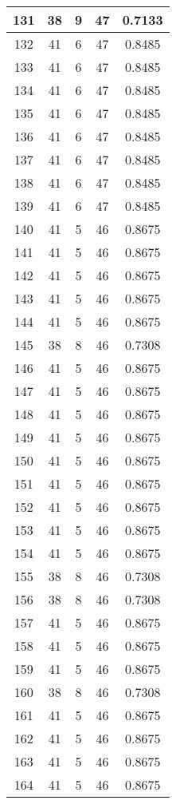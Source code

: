 \documentclass[letterpaper, 12pt]{article}
\begin{document}
\begin{longtable}{|c|c|c|c|c|}
\hline
131 & 38 & 9 & 47 & 0.7133 \\
\hline
132 & 41 & 6 & 47 & 0.8485 \\
\hline
133 & 41 & 6 & 47 & 0.8485 \\
\hline
134 & 41 & 6 & 47 & 0.8485 \\
\hline
135 & 41 & 6 & 47 & 0.8485 \\
\hline
136 & 41 & 6 & 47 & 0.8485 \\
\hline
137 & 41 & 6 & 47 & 0.8485 \\
\hline
138 & 41 & 6 & 47 & 0.8485 \\
\hline
139 & 41 & 6 & 47 & 0.8485 \\
\hline
140 & 41 & 5 & 46 & 0.8675 \\
\hline
141 & 41 & 5 & 46 & 0.8675 \\
\hline
142 & 41 & 5 & 46 & 0.8675 \\
\hline
143 & 41 & 5 & 46 & 0.8675 \\
\hline
144 & 41 & 5 & 46 & 0.8675 \\
\hline
145 & 38 & 8 & 46 & 0.7308 \\
\hline
146 & 41 & 5 & 46 & 0.8675 \\
\hline
147 & 41 & 5 & 46 & 0.8675 \\
\hline
148 & 41 & 5 & 46 & 0.8675 \\
\hline
149 & 41 & 5 & 46 & 0.8675 \\
\hline
150 & 41 & 5 & 46 & 0.8675 \\
\hline
151 & 41 & 5 & 46 & 0.8675 \\
\hline
152 & 41 & 5 & 46 & 0.8675 \\
\hline
153 & 41 & 5 & 46 & 0.8675 \\
\hline
154 & 41 & 5 & 46 & 0.8675 \\
\hline
155 & 38 & 8 & 46 & 0.7308 \\
\hline
156 & 38 & 8 & 46 & 0.7308 \\
\hline
157 & 41 & 5 & 46 & 0.8675 \\
\hline
158 & 41 & 5 & 46 & 0.8675 \\
\hline
159 & 41 & 5 & 46 & 0.8675 \\
\hline
160 & 38 & 8 & 46 & 0.7308 \\
\hline
161 & 41 & 5 & 46 & 0.8675 \\
\hline
162 & 41 & 5 & 46 & 0.8675 \\
\hline
163 & 41 & 5 & 46 & 0.8675 \\
\hline
164 & 41 & 5 & 46 & 0.8675 \\

\end{longtable}
\end{document}
